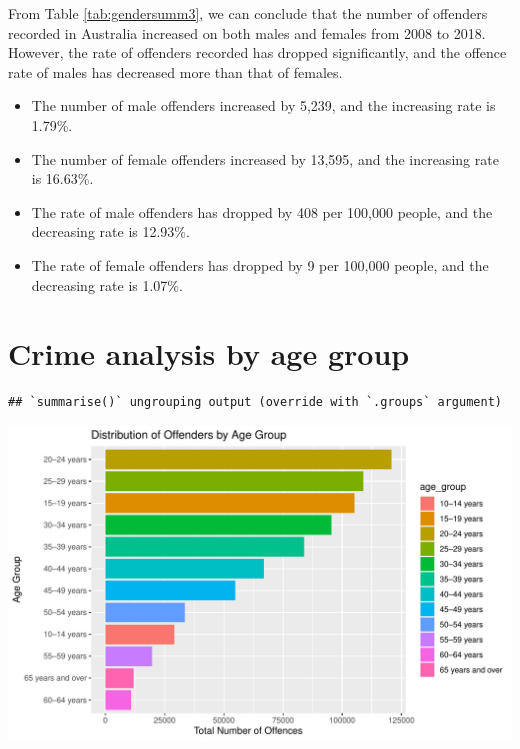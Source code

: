 \documentclass[11pt,a4paper,]{article}
\providecommand{\tightlist}{%
  \setlength{\itemsep}{0pt}\setlength{\parskip}{0pt}}
\let\origfigure\figure
\let\endorigfigure\endfigure
\renewenvironment{figure}[1][2] {
\expandafter\origfigure\expandafter[H]
} {
\endorigfigure
}
\begin{document}
From Table \ref{tab:gendersumm3}, we can conclude that the number of offenders recorded in Australia increased on both males and females from 2008 to 2018. However, the rate of offenders recorded has dropped significantly, and the offence rate of males has decreased more than that of females.

\begin{itemize}
\tightlist
\item
  The number of male offenders increased by 5,239, and the increasing rate is 1.79\%.\\
\item
  The number of female offenders increased by 13,595, and the increasing rate is 16.63\%.\\
\item
  The rate of male offenders has dropped by 408 per 100,000 people, and the decreasing rate is 12.93\%.\\
\item
  The rate of female offenders has dropped by 9 per 100,000 people, and the decreasing rate is 1.07\%.
\end{itemize}

\pagebreak

\section*{Crime analysis by age group}

\begin{verbatim}
## `summarise()` ungrouping output (override with `.groups` argument)
\end{verbatim}

\begin{figure}
\centering
\includegraphics{ETC5513-Assignment4_files/figure-latex/age1-1.pdf}
\caption{\label{fig:age1}Total offenders across age groups}
\end{figure}
\end{document}
